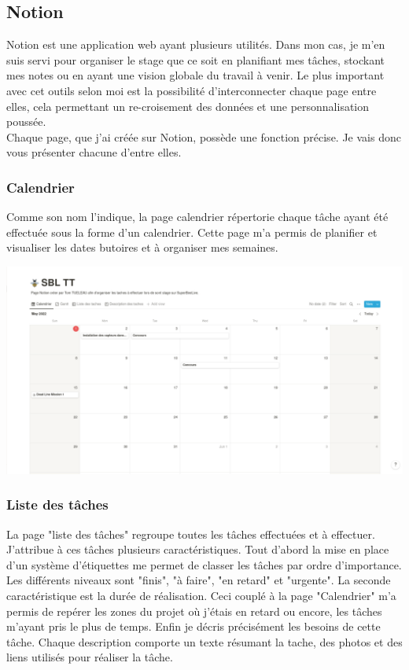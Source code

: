 \documentclass[12pt,french,a4paper]{article}
\begin{document}
\subsection{Notion}
Notion est une application web ayant plusieurs utilités. Dans mon cas, je m'en suis servi pour organiser le stage que ce soit en planifiant mes tâches, stockant mes notes ou en ayant une vision globale du travail à venir. Le plus important avec cet outils selon moi est la possibilité d'interconnecter chaque page entre elles, cela permettant un re-croisement des données et une personnalisation poussée.  
\\
Chaque page, que j'ai créée sur Notion, possède une fonction précise. Je vais donc vous présenter chacune d'entre elles.

\subsubsection{Calendrier}
Comme son nom l'indique, la page calendrier répertorie chaque tâche ayant été effectuée sous la forme d'un calendrier. Cette page m'a permis de planifier et visualiser les dates butoires et à organiser mes semaines.    
\begin{center}	
\includegraphics[scale=0.35]{../img/notioncalender.png}
\label{Calendrier}
\end{center}

\subsubsection{Liste des tâches}
La page "liste des tâches" regroupe toutes les tâches effectuées et à effectuer. J'attribue à ces tâches plusieurs caractéristiques. Tout d'abord la mise en place d'un système d'étiquettes me permet de classer les tâches par ordre d'importance. Les différents niveaux sont "finis", "à faire", "en retard" et "urgente". La seconde caractéristique est la durée de réalisation. Ceci  couplé à la page "Calendrier" m'a permis de repérer les zones du projet où j'étais en retard ou encore, les tâches m'ayant pris le plus de temps. Enfin je décris  précisément les besoins de cette tâche. Chaque description comporte un texte résumant la tache, des photos et des liens utilisés pour réaliser la tâche.
\end{document}
